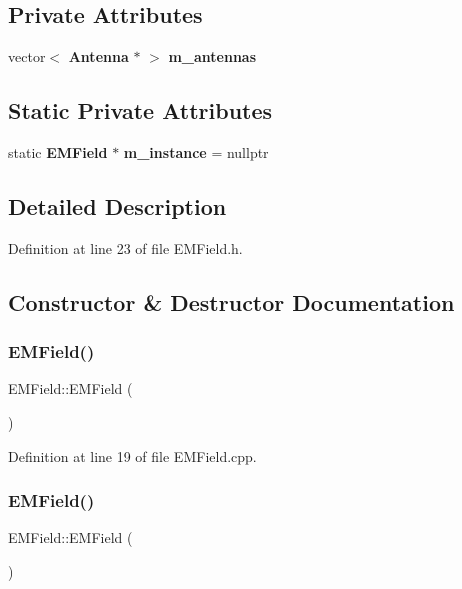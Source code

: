 \subsection*{Private Attributes}
\begin{DoxyCompactItemize}
\item 
vector$<$ \textbf{ Antenna} $\ast$ $>$ \textbf{ m\+\_\+antennas}
\end{DoxyCompactItemize}
\subsection*{Static Private Attributes}
\begin{DoxyCompactItemize}
\item 
static \textbf{ E\+M\+Field} $\ast$ \textbf{ m\+\_\+instance} = nullptr
\end{DoxyCompactItemize}


\subsection{Detailed Description}


Definition at line 23 of file E\+M\+Field.\+h.



\subsection{Constructor \& Destructor Documentation}
\mbox{\label{class_e_m_field_a054f389cfa853008f32c02d874aa4d58}} 
\subsubsection{E\+M\+Field()\hspace{0.1cm}{\footnotesize\ttfamily [1/2]}}
{\footnotesize\ttfamily E\+M\+Field\+::\+E\+M\+Field (\begin{DoxyParamCaption}{ }\end{DoxyParamCaption})\hspace{0.3cm}{\ttfamily [private]}}



Definition at line 19 of file E\+M\+Field.\+cpp.

\mbox{\label{class_e_m_field_a7760631ded36ba2c5a918c97a1cc93e9}} 
\subsubsection{E\+M\+Field()\hspace{0.1cm}{\footnotesize\ttfamily [2/2]}}
{\footnotesize\ttfamily E\+M\+Field\+::\+E\+M\+Field (\begin{DoxyParamCaption}\item[{const \textbf{ E\+M\+Field} \&}]{ }\end{DoxyParamCaption})\hspace{0.3cm}{\ttfamily [private]}}



